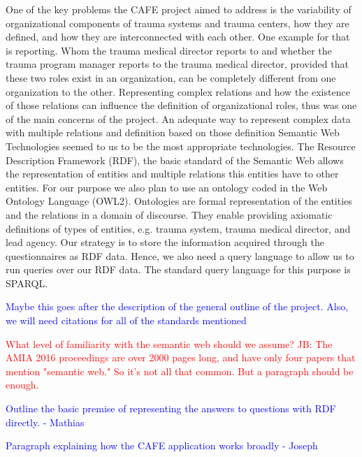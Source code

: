 \documentclass{amia}
\begin{document}
One of the key problems the CAFE project aimed to address is the variability of organizational components of trauma systems and trauma centers, how they are defined, and how they are interconnected with each other. One example for that is reporting. Whom the trauma medical director reports to and whether the trauma program manager reports to the trauma medical director, provided that these two roles exist in an organization, can be completely different from one organization to the other. Representing complex relations and how the existence of those relations can influence the definition of organizational roles, thus was one of the main concerns of the project. An adequate way to represent complex data with multiple relations and definition based on those definition Semantic Web Technologies seemed to us to be the most appropriate technologies. The Resource Description Framework (RDF), the basic standard of the Semantic Web allows the representation of entities and multiple relations this entities have to other entities. For our purpose we also plan to use an ontology coded in the Web Ontology Language (OWL2). Ontologies are formal representation of the entities and the relations in a domain of discourse. They enable providing axiomatic definitions of types of entities, e.g. trauma system, trauma medical director, and lead agency. Our strategy is to store the information acquired through the questionnaires as RDF data. Hence, we also need a query language to allow us to run queries over our RDF data. The standard query language for this purpose is SPARQL.

\textcolor{blue}{Maybe this goes after the description of the general outline of the project. Also, we will need citations for all of the standards mentioned}

\textcolor{red}{What level of familiarity with the semantic web should we assume?}
\textcolor{red}{JB: The AMIA 2016 proceedings are over 2000 pages long, and have only four papers that mention "semantic web." So it's not all that common. But a paragraph should be enough.}

\textcolor{blue}{Outline the basic premise of representing the answers to questions with RDF directly. - Mathias}

\textcolor{blue}{Paragraph explaining how the CAFE application works broadly - Joseph}

\pagebreak
\end{document}
